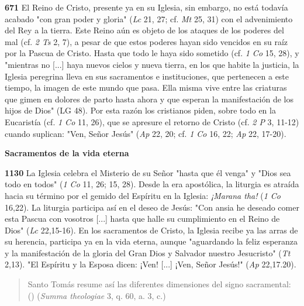 \textbf{671} El Reino de Cristo, presente ya en su Iglesia, sin embargo, no está todavía acabado "con gran poder y gloria" (\emph{Lc} 21, 27; cf. \emph{Mt} 25, 31) con el advenimiento del Rey a la tierra. Este Reino aún es objeto de los ataques de los poderes del mal (cf. \emph{2 Ts} 2, 7), a pesar de que estos poderes hayan sido vencidos en su raíz por la Pascua de Cristo. Hasta que todo le haya sido sometido (cf. \emph{1 Co} 15, 28), y "mientras no {[}...{]} haya nuevos cielos y nueva tierra, en los que habite la justicia, la Iglesia peregrina lleva en sus sacramentos e instituciones, que pertenecen a este tiempo, la imagen de este mundo que pasa. Ella misma vive entre las criaturas que gimen en dolores de parto hasta ahora y que esperan la manifestación de los hijos de Dios" (LG 48). Por esta razón los cristianos piden, sobre todo en la Eucaristía (cf. \emph{1 Co} 11, 26), que se apresure el retorno de Cristo (cf. \emph{2 P} 3, 11-12) cuando suplican: "Ven, Señor Jesús" (\emph{Ap} 22, 20; cf. \emph{1 Co} 16, 22; \emph{Ap} 22, 17-20).

\textbf{Sacramentos de la vida eterna}

\textbf{1130} La Iglesia celebra el Misterio de su Señor "hasta que él venga" y "Dios sea todo en todos" (\emph{1 Co} 11, 26; 15, 28). Desde la era apostólica, la liturgia es atraída hacia su término por el gemido del Espíritu en la Iglesia: \emph{¡Marana tha!} (\emph{1 Co} 16,22). La liturgia participa así en el deseo de Jesús: "Con ansia he deseado comer esta Pascua con vosotros {[}...{]} hasta que halle su cumplimiento en el Reino de Dios" (\emph{Lc} 22,15-16). En los sacramentos de Cristo, la Iglesia recibe ya las arras de su herencia, participa ya en la vida eterna, aunque "aguardando la feliz esperanza y la manifestación de la gloria del Gran Dios y Salvador nuestro Jesucristo" (\emph{Tt} 2,13). "El Espíritu y la Esposa dicen: ¡Ven! {[}...{]} ¡Ven, Señor Jesús!" (\emph{Ap} 22,17.20).

\begin{quote} 	Santo Tomás resume así las diferentes dimensiones del signo sacramental: 	 () (\emph{Summa theologiae} 3, q. 60, 	a. 3, c.) \end{quote}

